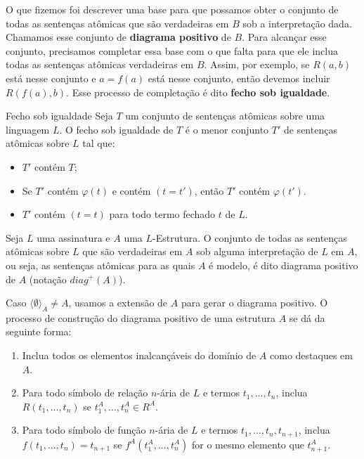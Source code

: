 O que fizemos foi descrever uma base para que possamos obter o conjunto de todas as sentenças atômicas que são verdadeiras em $B$ sob a interpretação dada. Chamamos esse conjunto de \textbf{diagrama positivo} de $B$. Para alcançar esse conjunto, precisamos completar essa base com o que falta para que ele inclua todas as sentenças atômicas verdadeiras em $B$. Assim, por exemplo, se $R(a,b)$ está nesse conjunto e $a = f(a)$ está nesse conjunto, então devemos incluir $R(f(a), b)$. Esse processo de completação é dito \textbf{fecho sob igualdade}.
\begin{definition}{Fecho sob igualdade}
    Seja $T$ um conjunto de sentenças atômicas sobre uma linguagem $L$. O fecho sob igualdade de $T$ é o menor conjunto $T'$ de sentenças atômicas sobre $L$ tal que:
    \begin{itemize}
        \item $T'$ contém $T$;
        \item Se $T'$ contém $\varphi(t)$ e contém $(t = t')$, então $T'$ contém $\varphi(t')$. 
        \item $T'$ contém $(t = t)$ para todo termo fechado $t$ de $L$.
    \end{itemize}
    Seja $L$ uma assinatura e $A$ uma $L$-Estrutura. O conjunto de todas as sentenças atômicas sobre $L$ que são verdadeiras em $A$ sob alguma interpretação de $L$ em $A$, ou seja, as sentenças atômicas para as quais $A$ é modelo, é dito diagrama positivo de $A$ (notação $diag^+(A)$).

    Caso $\langle \emptyset\rangle_A \neq A$, usamos a extensão de $A$ para gerar o diagrama positivo.
    O processo de construção do diagrama positivo de uma estrutura $A$ se dá da seguinte forma:
    \begin{enumerate}
        \item Inclua todos os elementos inalcançáveis do domínio de $A$ como destaques em $A$.
        \item Para todo símbolo de relação $n$-ária de $L$ e termos $t_1,...,t_n$, inclua $R(t_1,...,t_n)$ se $t_1^A,...,t_n^A \in R^A$.
        \item Para todo símbolo de função $n$-ária de $L$ e termos $t_1,...,t_n,t_{n+1}$, inclua $f(t_1,...,t_n) = t_{n+1}$ se $f^A(t_1^A,...,t_n^A)$ for o mesmo elemento que $t_{n+1}^A$.
    \end{enumerate}
\end{definition}

